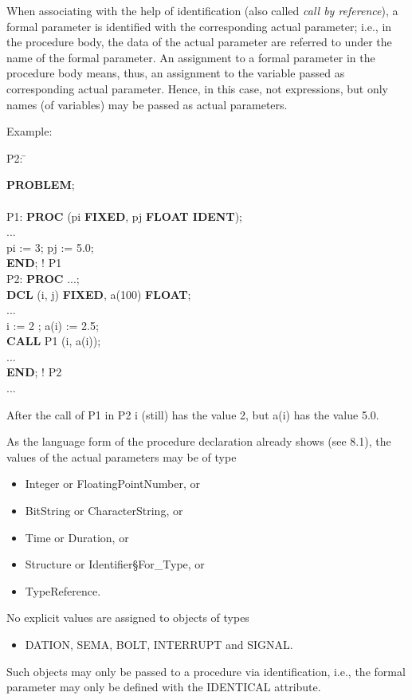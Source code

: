 When associating with the help of identification (also called {\em call
by reference}), a formal parameter is identified with the corresponding
actual parameter; i.e., in the procedure body, the data of the actual
parameter are referred to under the name of the formal parameter. An
assignment to a formal parameter in the procedure body means, thus, an
assignment to the variable passed as corresponding actual parameter.
Hence, in this case, not expressions, but only names (of variables) may
be passed as actual parameters.

Example:

\begin{tabbing}
P2: \= \kill

{\bf PROBLEM}; \> \\
    \> \\
P1: \> {\bf PROC} (pi {\bf FIXED}, pj {\bf FLOAT IDENT});\\
    \> ... \\
    \> pi := 3; pj := 5.0;\\
    \> {\bf END}; ! P1\\

P2: \> {\bf PROC} ...;\\
    \> {\bf DCL} (i, j) {\bf FIXED}, a(100) {\bf FLOAT};\\
    \> ... \\
    \> i := 2 ; a(i) := 2.5; \\
    \> {\bf CALL} P1 (i, a(i));\\
    \> ... \\
    \> {\bf END}; ! P2 \\
... \>
\end{tabbing}

After the call of P1 in P2 i (still) has the value 2, but a(i) has the
value 5.0.

As the language form of the procedure declaration already shows (see
8.1), the values of the actual parameters may be of type
\begin{itemize}
\item Integer or FloatingPointNumber, or
\item BitString or CharacterString, or
\item Time or Duration, or
\item Structure or Identifier\S For\_Type, or
\item TypeReference.
\end{itemize}
No explicit values are assigned to objects of types
\begin{itemize}
\item DATION, SEMA, BOLT, INTERRUPT and SIGNAL.
\end{itemize}
Such objects may only be passed to a procedure via identification, i.e.,
the formal parameter may only be defined with the IDENTICAL attribute.

